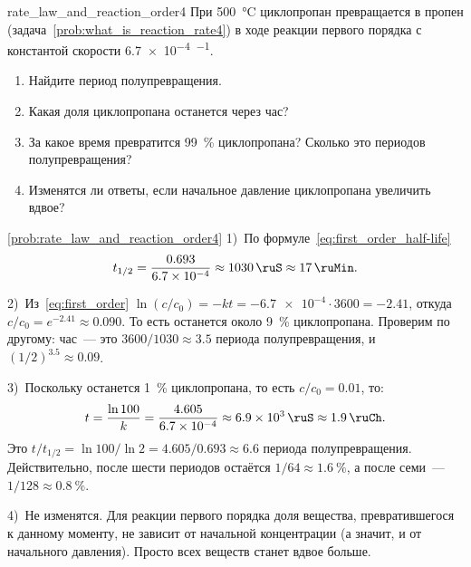 \begin{problem}{}{rate_law_and_reaction_order4}
    При \qty{500}{\degreeCelsius} циклопропан превращается в пропен (задача~\ref{prob:what_is_reaction_rate4}) в ходе реакции первого порядка с константой скорости \qty{6,7e-4}{\ruS\tothe{-1}}.
    \begin{enumerate}[label=\arabic*)]
        \item Найдите период полупревращения.
        \item Какая доля циклопропана останется через час?
        \item За какое время превратится \qty{99}{\percent} циклопропана? Сколько это периодов полупревращения?
        \item Изменятся ли ответы, если начальное давление циклопропана увеличить вдвое?
    \end{enumerate}
    \begin{sol}{\ref{prob:rate_law_and_reaction_order4}}
        1)~По формуле~\eqref{eq:first_order_half-life}
        \begin{equation*}
            t_{1/2} = \frac{\num{0,693}}{\num{6,7e-4}} \approx \qty{1030}{\ruS} \approx \qty{17}{\ruMin}.
        \end{equation*}

        2)~Из~\eqref{eq:first_order} $\ln (c/c_0) = -kt = -\num{6,7e-4} \cdot 3600 = \num{-2,41}$, откуда $c/c_0 = e^{\num{-2,41}} \approx \num{0,090}$. То есть останется около \qty{9}{\percent} циклопропана. Проверим по другому: час~--- это $3600/1030 \approx \num{3,5}$ периода полупревращения, и $(1/2)^{\num{3,5}} \approx \num{0,09}$.

        3)~Поскольку останется \qty{1}{\percent} циклопропана, то есть $c/c_0 = \num{0,01}$, то:
        \begin{equation*}
            t = \frac{\ln 100}{k} = \frac{\num{4,605}}{\num{6,7e-4}} \approx \qty{6,9e3}{\ruS} \approx \qty{1,9}{\ruCh}.
        \end{equation*}
        Это $t/t_{1/2} = \ln 100/\ln 2 = \num{4,605}/\num{0,693} \approx \num{6,6}$ периода полупревращения. Действительно, после шести периодов остаётся $1/64 \approx \qty{1,6}{\percent}$, а после семи~--- $1/128 \approx \qty{0,8}{\percent}$.

        4)~Не изменятся. Для реакции первого порядка доля вещества, превратившегося к данному моменту, не зависит от начальной концентрации (а значит, и от начального давления). Просто всех веществ станет вдвое больше.
    \end{sol}
\end{problem}

